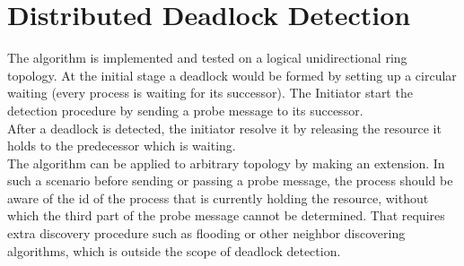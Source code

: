 \documentclass[a4paper, 14pt]{article}
\begin{document}
\section{Distributed Deadlock Detection}
The algorithm is implemented and tested on a logical unidirectional ring topology. At the initial stage a deadlock would be formed by setting up a circular waiting (every process is waiting for its successor). The Initiator start the detection procedure by sending a probe message to its successor.\\
After a deadlock is detected, the initiator resolve it by releasing the resource it holds to the predecessor which is waiting.\\
The algorithm can be applied to arbitrary topology by making an extension. In such a scenario before sending or passing a probe message, the process should be aware of the id of the process that is currently holding the resource, without which the third part of the probe message cannot be determined. That requires extra discovery procedure such as flooding or other neighbor discovering algorithms, which is outside the scope of deadlock detection. 

\newpage

{}
\end{document}
